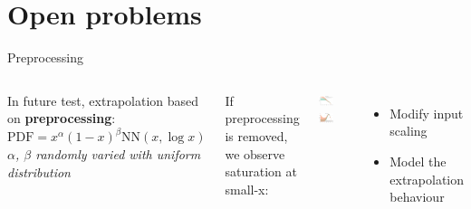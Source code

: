 \documentclass[aspectratio=169,10pt]{beamer}
\begin{document}
\section{Open problems}

\begin{frame}{Preprocessing}
\begin{columns}[t]

In future test, extrapolation based on \textbf{preprocessing}:\\
$\mathrm{PDF}=x^\alpha(1-x)^\beta \mathrm{NN}({x,\log x})$\\
{\footnotesize \textit{$\alpha$, $\beta$ randomly varied with uniform distribution} }

\vspace*{0.2cm}
If preprocessing is removed, we observe saturation at small-x:
\begin{center}
\includegraphics[width=0.48\textwidth]{feature_scaling/flatdbar}
\includegraphics[width=0.48\textwidth]{feature_scaling/gluon_saturation}
\end{center}

\vspace*{-1em}
\begin{itemize}
    \item Modify input scaling
    \item Model the extrapolation behaviour
\end{itemize}


\end{columns}
\end{frame}
\end{document}

